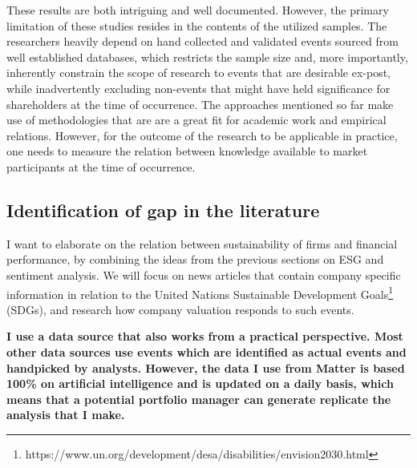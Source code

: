 These results are both intriguing and well documented. However, the primary limitation of these studies resides in the contents of the utilized samples. The researchers heavily depend on hand collected and validated events sourced from well established databases, which restricts the sample size and, more importantly, inherently constrain the scope of research to events that are desirable ex-post, while inadvertently excluding non-events that might have held significance for shareholders at the time of occurrence. The approaches mentioned so far make use of methodologies that are are a great fit for academic work and empirical relations. However, for the outcome of the research to be applicable in practice, one needs to measure the relation between knowledge available to market participants at the time of occurrence. 



\subsection{Identification of gap in the literature}


I want to elaborate on the relation between sustainability of firms and financial performance, by combining the ideas from the previous sections on ESG and sentiment analysis. We will focus on news articles that contain company specific information in relation to the United Nations Sustainable Development Goals\footnote{https://www.un.org/development/desa/disabilities/envision2030.html} (SDGs), and research how company valuation responds to such events. 


\textbf{I use a data source that also works from a practical perspective. Most other data sources use events which are identified as actual events and handpicked by analysts. However, the data I use from Matter is based 100\% on artificial intelligence and is updated on a daily basis, which means that a potential portfolio manager can generate replicate the analysis that I make.} 